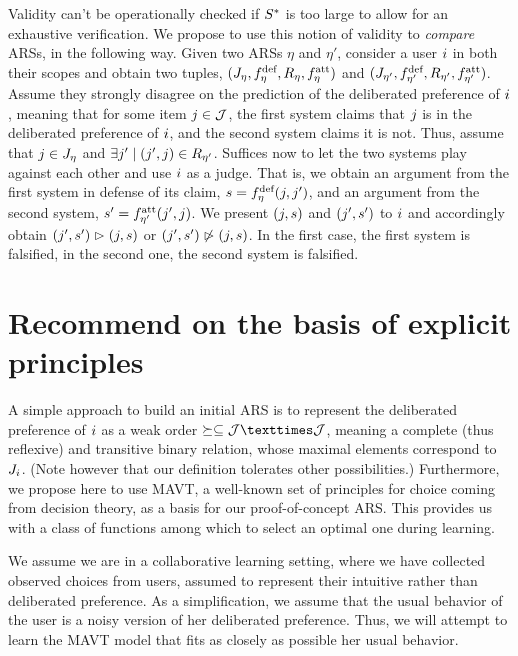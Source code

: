 \documentclass[french, english]{da2pl2018}
\begin{document}
Validity can’t be operationally checked if $\allargs$ is too large to allow for an exhaustive verification. We propose to use this notion of validity to \emph{compare} \acp{ARS}, in the following way. Given two \acp{ARS} $\eta$ and $\eta'$, consider a user $\usr$ in both their scopes and obtain two tuples, $(\mitems, \mdef, R_\eta, \matt)$ and $(\mitems[\eta'], \mdef[\eta'], R_{\eta'}, \matt[\eta'])$. Assume they strongly disagree on the prediction of the deliberated preference of $\usr$, meaning that for some item $\itm \in \allitems$, the first system claims that $\itm$ is in the deliberated preference of $\usr$, and the second system claims it is not. Thus, assume that $\itm \in \mitems$ and $\exists \itm' \suchthat (\itm', \itm) \in R_{\eta'}$. Suffices now to let the two systems play against each other and use $\usr$ as a judge. That is, we obtain an argument from the first system in defense of its claim, $\ar = \mdef(\itm, \itm')$, and an argument from the second system, $\ar' = \matt[\eta'](\itm', \itm)$. We present $(\itm, \ar)$ and $(\itm', \ar')$ to $\usr$ and accordingly obtain $(\itm', \ar') \ibeats (\itm, \ar)$ or $(\itm', \ar') \nibeats (\itm, \ar)$. In the first case, the first system is falsified, in the second one, the second system is falsified.

\section{Recommend on the basis of explicit principles}
A simple approach to build an initial \ac{ARS} is to represent the deliberated preference of $\usr$ as a weak order $\succeq \subseteq \allitems × \allitems$, meaning a complete (thus reflexive) and transitive binary relation, whose maximal elements correspond to $\uitems$. (Note however that our definition tolerates other possibilities.)
Furthermore, 
we propose here to use \ac{MAVT}, a well-known set of principles for choice coming from decision theory, as a basis for our proof-of-concept \ac{ARS}. This provides us with a class of functions among which to select an optimal one during learning.

We assume we are in a collaborative learning setting, where we have collected observed choices from users, assumed to represent their intuitive rather than deliberated preference. 
As a simplification, we assume that the usual behavior of the user is a noisy version of her deliberated preference. Thus, we will attempt to learn the \ac{MAVT} model that fits as closely as possible her usual behavior. 
\end{document}
